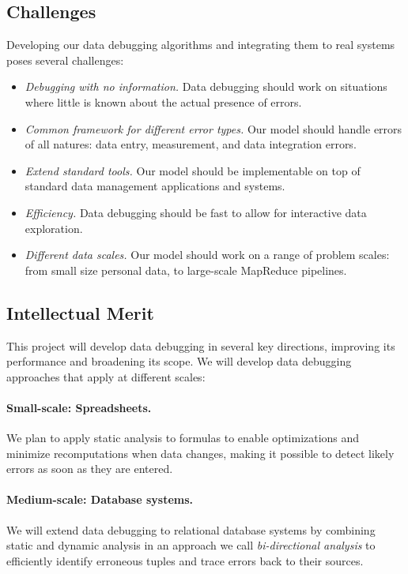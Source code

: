 \subsection{Challenges} %
\label{sub:challenges}
Developing our data debugging algorithms and integrating them to real systems poses several challenges:
\begin{itemize}
	\item \emph{Debugging with no information.} Data debugging should work on situations where little is known about the actual presence of errors.
	\item \emph{Common framework for different error types.} Our model should handle errors of all natures: data entry, measurement, and data integration errors.
	\item \emph{Extend standard tools.} Our model should be implementable on top of standard data management applications and systems.
	\item \emph{Efficiency.} Data debugging should be fast to allow for interactive data exploration.
	\item \emph{Different data scales.} Our model should work on a range of problem scales: from small size personal data, to large-scale MapReduce pipelines.
\end{itemize}

\subsection{Intellectual Merit}

This project will develop data debugging in several key directions,
improving its performance and broadening its scope. We will develop
data debugging approaches that apply at different scales:

\paragraph{Small-scale: Spreadsheets.} We plan to apply static
analysis to formulas to enable optimizations and minimize
recomputations when data changes, making it possible to detect
likely errors as soon as they are entered.

\paragraph{Medium-scale: Database systems.} We will extend data debugging to
relational database systems by combining static and dynamic analysis
in an approach we call \emph{bi-directional
  analysis} to efficiently identify erroneous tuples and trace errors back to their sources.


